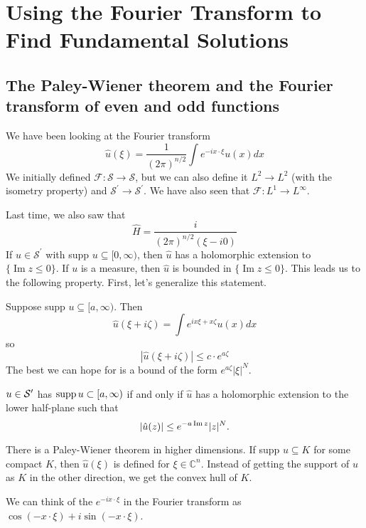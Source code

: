 \newpage

\section{Using the Fourier Transform to Find Fundamental Solutions}

\subsection{The Paley-Wiener theorem and the Fourier transform of even and odd functions}

We have been looking at the Fourier transform
$$
\widehat{u}(\xi)=\frac{1}{(2 \pi)^{n / 2}} \int e^{-i x \cdot \xi} u(x) d x
$$
We initially defined $\mathcal{F}: \mathcal{S} \rightarrow \mathcal{S}$, but we can also define it $L^{2} \rightarrow L^{2}$ (with the isometry property) and $\mathcal{S}^{\prime} \rightarrow \mathcal{S}^{\prime} .$ We have also seen that $\mathcal{F}: L^{1} \rightarrow L^{\infty}$.

Last time, we also saw that
$$
\widehat{H}=\frac{i}{(2\pi)^{n/2}(\xi-i 0)}
$$
If $u \in \mathcal{S}^{\prime}$ with supp $u \subseteq[0, \infty)$, then $\widehat{u}$ has a holomorphic extension to $\{\operatorname{Im} z \leq 0\} .$ If $u$ is a measure, then $\widehat{u}$ is bounded in $\{\operatorname{Im} z \leq 0\}$. This leads us to the following property. First, let's generalize this statement.

Suppose supp $u \subseteq[a, \infty)$. Then
$$
\widehat{u}(\xi+i \zeta)=\int e^{i x \xi+x \zeta} u(x) d x
$$
so
$$
|\widehat{u}(\xi+i \zeta)| \leq c\cdot e^{a \zeta}
$$
The best we can hope for is a bound of the form $e^{a \zeta}|\xi|^{N}$.

\begin{theorem}
 $u\in \mathcal{S}'$ has $\operatorname{{\rm supp}} u\subset [a,\infty)$ if and only if $\hat u$ has a holomorphic extension to the lower half-plane such that
\[
    |\hat u(z)| \le e^{-a \operatorname{{\rm Im}} z}|z|^N.
\]
\end{theorem}

\begin{remark}
    There is a Paley-Wiener theorem in higher dimensions. If supp $u \subseteq K$ for some compact $K$, then $\widehat{u}(\xi)$ is defined for $\xi \in \mathbb{C}^{n} .$ Instead of getting the support of $u$ as $K$ in the other direction, we get the convex hull of $K$.
\end{remark}

We can think of the $e^{-ix\cdot \xi}$ in the Fourier transform as $\cos(-x\cdot \xi)+i \sin(-x\cdot \xi)$.

